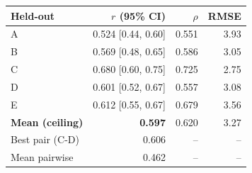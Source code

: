 \setlength{\tabcolsep}{4pt}
\begin{tabular}{lrrr}
\toprule
Held-out & $r$ (95\% CI) & $\rho$ & RMSE \\
\midrule
A & 0.524 [0.44, 0.60] & 0.551 & 3.93 \\
B & 0.569 [0.48, 0.65] & 0.586 & 3.05 \\
C & 0.680 [0.60, 0.75] & 0.725 & 2.75 \\
D & 0.601 [0.52, 0.67] & 0.557 & 3.08 \\
E & 0.612 [0.55, 0.67] & 0.679 & 3.56 \\
\midrule
\textbf{Mean (ceiling)} & \textbf{0.597} & 0.620 & 3.27 \\
Best pair (C-D) & 0.606 & -- & -- \\
Mean pairwise & 0.462 & -- & -- \\
\bottomrule
\end{tabular}